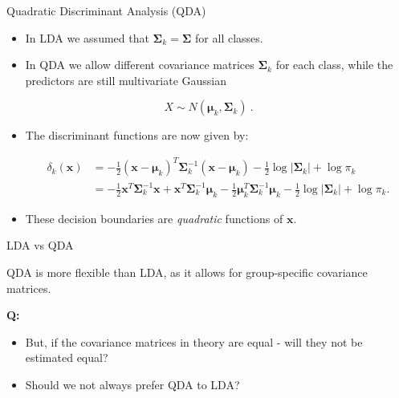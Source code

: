 \documentclass[10pt,ignorenonframetext,]{beamer}
\providecommand{\tightlist}{%
  \setlength{\itemsep}{0pt}\setlength{\parskip}{0pt}}
\begin{document}
\begin{frame}

\begin{block}{Quadratic Discriminant Analysis (QDA)}

\begin{itemize}
\item
  In LDA we assumed that \(\boldsymbol{\Sigma}_k = \boldsymbol{\Sigma}\)
  for all classes.
\item
  In QDA we allow different covariance matrices
  \(\boldsymbol{\Sigma}_k\) for each class, while the predictors are
  still multivariate Gaussian
\end{itemize}

\[X \sim N(\boldsymbol{\mu}_k, \boldsymbol{\Sigma}_k) \ .\]

\begin{itemize}
\tightlist
\item
  The discriminant functions are now given by:

  \begin{align*} \delta_k({\boldsymbol x}) &= -\frac{1}{2}({\boldsymbol x}-\boldsymbol{\mu}_k)^T \boldsymbol{\Sigma}_k^{-1}({\boldsymbol x}-\boldsymbol{\mu}_k)-\frac{1}{2}\log |\boldsymbol{\Sigma}_k| + \log \pi_k \\ 
  &= -\frac{1}{2} {\boldsymbol x}^T \boldsymbol{\Sigma}_k^{-1}{\boldsymbol x} + {\boldsymbol x}^T \boldsymbol{\Sigma}_k^{-1}\boldsymbol{\mu}_k - \frac{1}{2} \boldsymbol{\mu}_k^T \boldsymbol{\Sigma}_k^{-1}\boldsymbol{\mu}_k - \frac{1}{2}\log |\boldsymbol{\Sigma}_k | + \log \pi_k.
  \end{align*}
\item
  These decision boundaries are \emph{quadratic} functions of
  \({\boldsymbol x}\).
\end{itemize}

\end{block}

\end{frame}

\begin{frame}

\begin{block}{LDA vs QDA}

\vspace{2mm}

QDA is more flexible than LDA, as it allows for group-specific
covariance matrices.

\vspace{4mm}

\textbf{Q:}

\begin{itemize}
\tightlist
\item
  But, if the covariance matrices in theory are equal - will they not be
  estimated equal?
\item
  Should we not always prefer QDA to LDA?
\end{itemize}

\end{block}

\end{frame}
\end{document}
